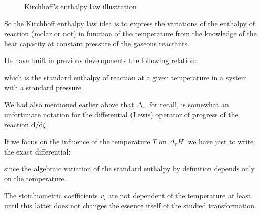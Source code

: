 \begin{figure}[H]
		\vspace*{3mm}	
		\caption{Kirchhoff's enthalpy law illustration}
	\end{figure}
	So the Kirchhoff enthalpy law idea is to express the variations of the enthalpy of reaction (molar or not) in function of the temperature from the knowledge of the heat capacity at constant pressure of the gaseous reactants.

	He have built in previous developments the following relation:
	
	which is the standard enthalpy of reaction at a given temperature in a system with a standard pressure.

	We had also mentioned earlier above that $\Delta_r$, for recall, is somewhat an unfortunate notation for the differential (Lewis) operator of progress of the reaction $\mathrm{d}/\mathrm{d}\xi$.
	
	If we focus on the influence of the temperature $T$ on $\Delta_r H^\circ$ we have just to write the exact differential:
	
	since the algebraic variation of the standard enthalpy by definition depends only on the temperature.

	The stoichiometric coefficients $v_i$ are not dependent of the temperature at least until this latter does not changes the essence itself of the studied transformation.
	
